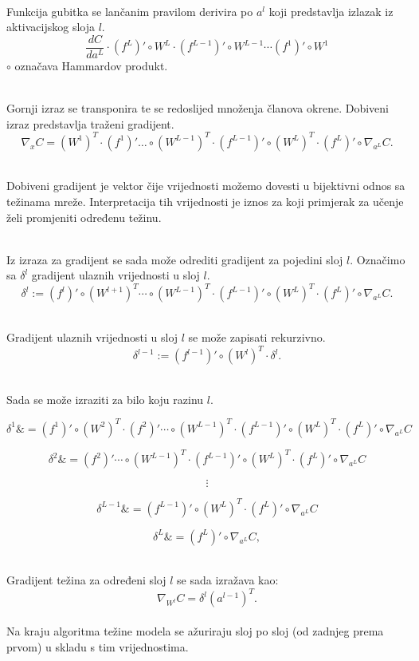 	\noindent\\Funkcija gubitka se lančanim pravilom derivira po \(a^l\) koji predstavlja izlazak iz aktivacijskog sloja \(l\).
	\[{\frac {dC}{da^{L}}}\cdot (f^{L})'\circ W^{L}\cdot (f^{L-1})'\circ W^{L-1}\cdots (f^{1})'\circ W^{1}\]
	\(\circ\) označava Hammardov produkt.
	
	\noindent\\Gornji izraz se transponira te se redoslijed množenja članova okrene. Dobiveni izraz predstavlja traženi gradijent.
	\[\nabla _{x}C=(W^{1})^{T}\cdot (f^{1})'\ldots \circ (W^{L-1})^{T}\cdot (f^{L-1})'\circ (W^{L})^{T}\cdot (f^{L})'\circ \nabla _{a^{L}}C.\]
	
	\noindent\\Dobiveni gradijent je vektor čije vrijednosti možemo dovesti u bijektivni odnos sa težinama mreže. Interpretacija tih vrijednosti je iznos za koji primjerak za učenje želi promjeniti određenu težinu.
	
	\noindent\\Iz izraza za gradijent se sada može odrediti gradijent za pojedini sloj \(l\). Označimo sa \(\delta ^{l}\) gradijent ulaznih vrijednosti u sloj \(l\). 
	\[\delta ^{l}:=(f^{l})'\circ (W^{l+1})^{T}\cdots \circ (W^{L-1})^{T}\cdot (f^{L-1})'\circ (W^{L})^{T}\cdot (f^{L})'\circ \nabla _{a^{L}}C.\]
	
	\noindent\\Gradijent ulaznih vrijednosti u sloj \(l\) se može zapisati rekurzivno.
	\[\delta ^{l-1}:=(f^{l-1})'\circ (W^{l})^{T}\cdot \delta ^{l}.\]
	
	\noindent\\Sada se može izraziti za bilo koju razinu \(l\).
	
	$$\delta ^{1}\&=(f^{1})'\circ (W^{2})^{T}\cdot (f^{2})'\cdots \circ (W^{L-1})^{T}\cdot (f^{L-1})'\circ (W^{L})^{T}\cdot (f^{L})'\circ \nabla _{a^{L}}C$$
					
				$$\delta ^{2}\&=(f^{2})'\cdots \circ (W^{L-1})^{T}\cdot (f^{L-1})'\circ (W^{L})^{T}\cdot (f^{L})'\circ \nabla _{a^{L}}C$$
				
				$$\vdots$$ 
				
				$$\delta ^{L-1}\&=(f^{L-1})'\circ (W^{L})^{T}\cdot (f^{L})'\circ \nabla _{a^{L}}C$$
				
				$$\delta ^{L}\&=(f^{L})'\circ \nabla _{a^{L}}C,$$
		
		\noindent\\Gradijent težina za određeni sloj \(l\) se sada izražava kao:
		\[\nabla _{W^{l}}C=\delta ^{l}(a^{l-1})^{T}.\]
		\noindent\\Na kraju algoritma težine modela se ažuriraju sloj po sloj (od zadnjeg prema prvom) u skladu s tim vrijednostima.  


